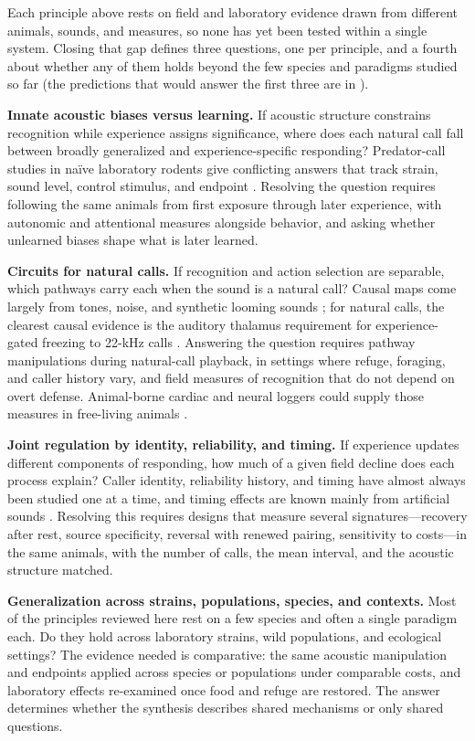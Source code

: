Each principle above rests on field and laboratory evidence drawn from different animals, sounds, and measures, so none has yet been tested within a single system. Closing that gap defines three questions, one per principle, and a fourth about whether any of them holds beyond the few species and paradigms studied so far (the predictions that would answer the first three are in ).

\textbf{Innate acoustic biases versus learning.} If acoustic structure constrains recognition while experience assigns significance, where does each natural call fall between broadly generalized and experience-specific responding? Predator-call studies in naïve laboratory rodents give conflicting answers that track strain, sound level, control stimulus, and endpoint \citep{HendrieNeill1991,KindermannEtAl2009}. Resolving the question requires following the same animals from first exposure through later experience, with autonomic and attentional measures alongside behavior, and asking whether unlearned biases shape what is later learned.

\textbf{Circuits for natural calls.} If recognition and action selection are separable, which pathways carry each when the sound is a natural call? Causal maps come largely from tones, noise, and synthetic looming sounds \citep{TovoteEtAl2016,FadokEtAl2017,XiongEtAl2015,LiEtAl2021}; for natural calls, the clearest causal evidence is the auditory thalamus requirement for experience-gated freezing to 22-kHz calls \citep{KimEtAl2010}. Answering the question requires pathway manipulations during natural-call playback, in settings where refuge, foraging, and caller history vary, and field measures of recognition that do not depend on overt defense. Animal-borne cardiac and neural loggers could supply those measures in free-living animals \citep{GaidicaDantzer2020,GaidicaDantzer2022}.

\textbf{Joint regulation by identity, reliability, and timing.} If experience updates different components of responding, how much of a given field decline does each process explain? Caller identity, reliability history, and timing have almost always been studied one at a time, and timing effects are known mainly from artificial sounds \citep{Hare1998,HareAtkins2001,Davis1970}. Resolving this requires designs that measure several signatures---recovery after rest, source specificity, reversal with renewed pairing, sensitivity to costs---in the same animals, with the number of calls, the mean interval, and the acoustic structure matched.

\textbf{Generalization across strains, populations, species, and contexts.} Most of the principles reviewed here rest on a few species and often a single paradigm each. Do they hold across laboratory strains, wild populations, and ecological settings? The evidence needed is comparative: the same acoustic manipulation and endpoints applied across species or populations under comparable costs, and laboratory effects re-examined once food and refuge are restored. The answer determines whether the synthesis describes shared mechanisms or only shared questions.
